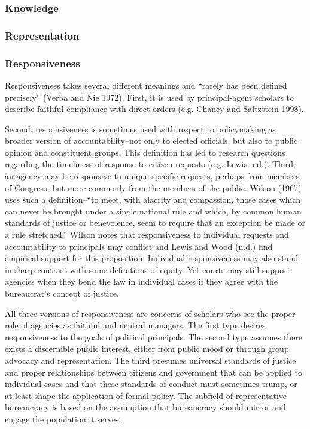 
\subsubsection{Knowledge}
\subsubsection{Representation}
\subsubsection{Responsiveness} 

Responsiveness takes several different meanings and ``rarely has been defined precisely'' (Verba and Nie 1972). First, it is used by principal-agent scholars to describe faithful compliance with direct orders (e.g. Chaney and Saltzstein 1998). 

Second, responsiveness is sometimes used with respect to policymaking as broader version of accountability--not only to elected officials, but also to public opinion and constituent groups. This definition has led to research questions regarding the timeliness of response to citizen requests (e.g. Lewis n.d.).
Third, an agency may be responsive to unique specific requests, perhaps from members of Congress, but more commonly from the members of the public. Wilson (1967) uses such a definition--``to meet, with alacrity and compassion, those cases which can never be brought under a single national rule and which, by common human standards of justice or benevolence, seem to require that an exception be made or a rule stretched.'' Wilson notes that responsiveness to individual requests and accountability to principals may conflict and Lewis and Wood (n.d.) find empirical support for this proposition. Individual responsiveness may also stand in sharp contrast with some definitions of equity. Yet courts may still support agencies when they bend the law in individual cases if they agree with the bureaucrat's concept of justice.

All three versions of responsiveness are concerns of scholars who see the proper role of agencies as faithful and neutral managers.  The first type desires responsiveness to the goals of political principals. The second type assumes there exists a discernible public interest, either from public mood or through group advocacy and representation. The third presumes universal standards of justice and proper relationships between citizens and government that can be applied to individual cases and that these standards of conduct must sometimes trump, or at least shape the application of formal policy. The subfield of representative bureaucracy is based on the assumption that bureaucracy should mirror and engage the population it serves. 
